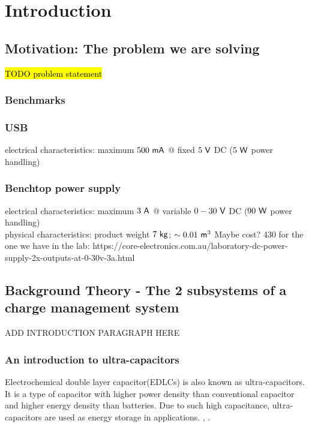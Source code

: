 \section{Introduction}
\subsection{Motivation: The problem we are solving}
\hl{TODO problem statement}
\subsubsection{Benchmarks}
\subsubsection{USB}
electrical characteristics: maximum $500 \ \mathsf{mA}$ @ fixed $5 \ \mathsf{V}$ DC ($5 \ \mathsf{W}$ power handling)
\subsubsection{Benchtop power supply}
electrical characteristics: maximum $3 \ \mathsf{A}$ @ variable $0 - 30 \ \mathsf{V}$ DC ($90 \ \mathsf{W}$ power handling)
~\\
physical characteristics: product weight $7 \ \mathsf{kg}$; $\sim 0.01 \ \mathsf{m}^3$
Maybe cost? 430 for the one we have in the lab:  https://core-electronics.com.au/laboratory-dc-power-supply-2x-outputs-at-0-30v-3a.html
\subsection{Background Theory - The 2 subsystems of a charge management system}

ADD INTRODUCTION PARAGRAPH HERE

\subsubsection{An introduction to ultra-capacitors}
Electrochemical double layer capacitor(EDLCs) is also known as ultra-capacitors. It is a type of capacitor with higher power density than conventional capacitor and higher energy density than batteries. Due to such high capacitance, ultra-capacitors are used as energy storage in applications. \cite{maxwell}, \cite{murata}. 

